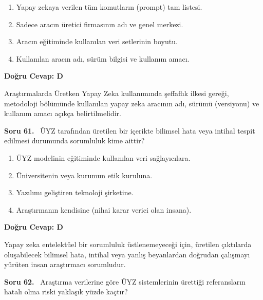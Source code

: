 \documentclass[11pt,a4paper,openany]{book}
\begin{document}
\begin{enumerate}[label=\Alph*), leftmargin=25pt, topsep=4pt, itemsep=2pt]
        \item Yapay zekaya verilen tüm komutların (prompt) tam listesi.
        \item Sadece aracın üretici firmasının adı ve genel merkezi.
        \item Aracın eğitiminde kullanılan veri setlerinin boyutu.
        \item Kullanılan aracın adı, sürüm bilgisi ve kullanım amacı.
\end{enumerate}

\vspace{4pt}
\begin{tcolorbox}[title=Cevap ve Açıklama, colback=gray!3!white, colframe=primarycolor!90!black, arc=2mm, fonttitle=\bfseries\sffamily, top=6pt, bottom=6pt]
    \textbf{Doğru Cevap: D}

    \vspace{2pt}
    Araştırmalarda Üretken Yapay Zeka kullanımında şeffaflık ilkesi gereği, metodoloji bölümünde kullanılan yapay zeka aracının adı, sürümü (versiyonu) ve kullanım amacı açıkça belirtilmelidir.
\end{tcolorbox}
\vspace{10pt}
\needspace{5cm}
\vspace{8pt}
\noindent\textbf{\large\sffamily Soru 61.} \ ÜYZ tarafından üretilen bir içerikte bilimsel hata veya intihal tespit edilmesi durumunda sorumluluk kime aittir?

\begin{enumerate}[label=\Alph*), leftmargin=25pt, topsep=4pt, itemsep=2pt]
        \item ÜYZ modelinin eğitiminde kullanılan veri sağlayıcılara.
        \item Üniversitenin veya kurumun etik kuruluna.
        \item Yazılımı geliştiren teknoloji şirketine.
        \item Araştırmanın kendisine (nihai karar verici olan insana).
\end{enumerate}

\vspace{4pt}
\begin{tcolorbox}[title=Cevap ve Açıklama, colback=gray!3!white, colframe=primarycolor!90!black, arc=2mm, fonttitle=\bfseries\sffamily, top=6pt, bottom=6pt]
    \textbf{Doğru Cevap: D}

    \vspace{2pt}
    Yapay zeka entelektüel bir sorumluluk üstlenemeyeceği için, üretilen çıktılarda oluşabilecek bilimsel hata, intihal veya yanlış beyanlardan doğrudan çalışmayı yürüten insan araştırmacı sorumludur.
\end{tcolorbox}
\vspace{10pt}
\needspace{5cm}
\vspace{8pt}
\noindent\textbf{\large\sffamily Soru 62.} \ Araştırma verilerine göre ÜYZ sistemlerinin ürettiği referansların hatalı olma riski yaklaşık yüzde kaçtır?
\end{document}
